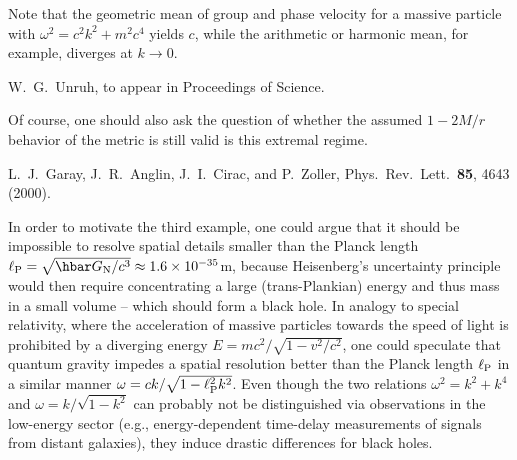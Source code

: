 \documentclass[aps,prl,showpacs,amssymb,nofootinbib,twocolumn]{revtex4}
\begin{document}
\begin{thebibliography}{499}
Note that the geometric mean of group and phase velocity for a massive
particle with $\omega^2=c^2k^2+m^2c^4$ yields $c$, while the
arithmetic or harmonic mean, for example, diverges at $k\to0$. 

W.~G.~Unruh, to appear in Proceedings of Science.  

Of course, one should also ask the question of whether the assumed
$1-2M/r$ behavior of the metric is still valid is this extremal
regime. 

L.~J.~Garay, J.~R.~Anglin, J.~I.~Cirac, and P.~Zoller,
Phys.\ Rev.\ Lett.\ {\bf 85}, 4643 (2000). 

In order to motivate the third example, one could argue that it should 
be impossible to resolve spatial details smaller than the Planck
length 
$\ell_{\rm P}=\sqrt{\hbar G_{\rm N}/c^3}\approx1.6\times10^{-35}$m,
because Heisenberg's uncertainty principle would then require
concentrating a large (trans-Plankian) energy and thus mass in a small 
volume -- which should form a black hole. 
%
In analogy to special relativity, where the acceleration of massive
particles towards the speed of light is prohibited by a diverging
energy $E=mc^2/\sqrt{1-v^2/c^2}$, one could speculate that quantum
gravity impedes a spatial resolution better than the Planck length
$\ell_{\rm P}$ in a similar manner 
$\omega=ck/\sqrt{1-\ell_{\rm P}^2k^2}$.
%
%
Even though the two relations $\omega^2=k^2+k^4$ and 
$\omega=k/\sqrt{1-k^2}$ can probably not be
distinguished via observations in the low-energy sector 
(e.g., energy-dependent time-delay measurements of signals from
distant galaxies), they induce drastic differences for black holes.  

\end{thebibliography}
\end{document}

